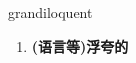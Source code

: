 
\begin{frame}
{\huge grandiloquent}
\begin{center}
\begin{enumerate}\Large
  \item \textbf{(语言等)浮夸的}
\end{enumerate}
\end{center}
\end{frame}
